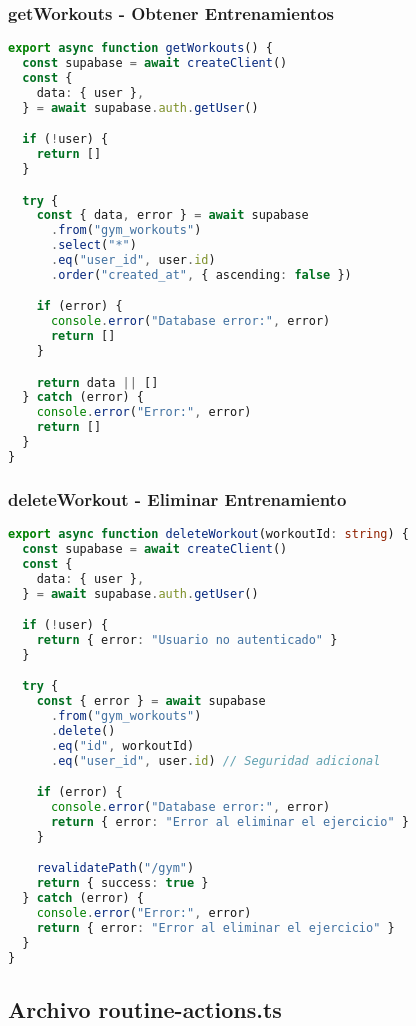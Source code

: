 \documentclass[12pt,a4paper]{article}
\begin{document}
\subsubsection{getWorkouts - Obtener Entrenamientos}

\begin{lstlisting}[language=typescript, caption=Función getWorkouts completa]
export async function getWorkouts() {
  const supabase = await createClient()
  const {
    data: { user },
  } = await supabase.auth.getUser()

  if (!user) {
    return []
  }

  try {
    const { data, error } = await supabase
      .from("gym_workouts")
      .select("*")
      .eq("user_id", user.id)
      .order("created_at", { ascending: false })

    if (error) {
      console.error("Database error:", error)
      return []
    }

    return data || []
  } catch (error) {
    console.error("Error:", error)
    return []
  }
}
\end{lstlisting}

\subsubsection{deleteWorkout - Eliminar Entrenamiento}

\begin{lstlisting}[language=typescript, caption=Función deleteWorkout completa]
export async function deleteWorkout(workoutId: string) {
  const supabase = await createClient()
  const {
    data: { user },
  } = await supabase.auth.getUser()

  if (!user) {
    return { error: "Usuario no autenticado" }
  }

  try {
    const { error } = await supabase
      .from("gym_workouts")
      .delete()
      .eq("id", workoutId)
      .eq("user_id", user.id) // Seguridad adicional

    if (error) {
      console.error("Database error:", error)
      return { error: "Error al eliminar el ejercicio" }
    }

    revalidatePath("/gym")
    return { success: true }
  } catch (error) {
    console.error("Error:", error)
    return { error: "Error al eliminar el ejercicio" }
  }
}
\end{lstlisting}

\subsection{Archivo routine-actions.ts}
\end{document}
